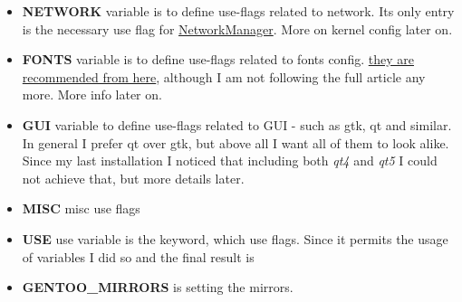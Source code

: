 \documentclass[10pt,a4paper]{article}
\begin{document}
\begin{itemize}

                       
                    \item \textbf{NETWORK} variable is to define use-flags related to network. Its only entry is the necessary use flag for \href{https://wiki.gentoo.org/wiki/NetworkManager#Installation}{NetworkManager}. More on kernel config later on.
                    

    
                    \item \textbf{FONTS} variable is to define use-flags related to fonts config. \href{http://kev009.com/wp/2009/12/getting-beautiful-fonts-in-gentoo-linux/}{they are recommended from here}, although I am not following the full article any more. More info later on. 
                    

    
                    \item \textbf{GUI} variable to define use-flags related to GUI - such as gtk, qt and similar. In general I prefer qt over gtk, but above all I want all of them to look alike. Since my last installation I noticed that including both \textit{qt4} and \textit{qt5} I could not achieve that, but more details later.
                    

    
                    \item \textbf{MISC} misc use flags
                    

    
                    \item \textbf{USE} use variable is the keyword, which use flags. Since it permits the usage of variables I did so and the final result is
                    

                    
                    \item \textbf{GENTOO\_MIRRORS} is setting the mirrors. 
                    

\end{itemize}
\end{document}
